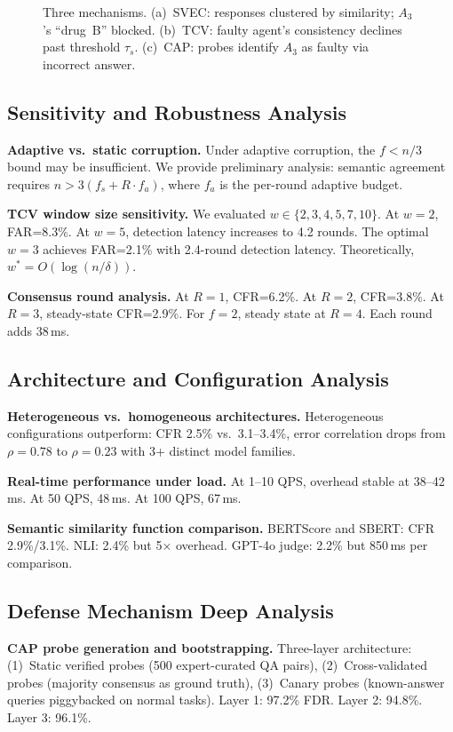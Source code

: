 \documentclass[journal,10pt]{IEEEtran}
\begin{document}
\begin{figure}[t]
\caption{Three mechanisms. (a)~SVEC: responses clustered by similarity; $A_3$'s ``drug~B'' blocked. (b)~TCV: faulty agent's consistency declines past threshold $\tau_s$. (c)~CAP: probes identify $A_3$ as faulty via incorrect answer.}
\label{fig:mechanisms}
\end{figure}

\subsection{Sensitivity and Robustness Analysis}
\textbf{Adaptive vs.\ static corruption.}
Under adaptive corruption, the $f < n/3$ bound may be insufficient. We provide preliminary analysis: semantic agreement requires $n > 3(f_s + R \cdot f_a)$, where $f_a$ is the per-round adaptive budget.

\textbf{TCV window size sensitivity.}
We evaluated $w \in \{2,3,4,5,7,10\}$. At $w=2$, FAR=8.3\%. At $w=5$, detection latency increases to 4.2 rounds. The optimal $w=3$ achieves FAR=2.1\% with 2.4-round detection latency. Theoretically, $w^* = O(\log(n/\delta))$.

\textbf{Consensus round analysis.}
At $R=1$, CFR=6.2\%. At $R=2$, CFR=3.8\%. At $R=3$, steady-state CFR=2.9\%. For $f=2$, steady state at $R=4$. Each round adds 38\,ms.

\subsection{Architecture and Configuration Analysis}
\textbf{Heterogeneous vs.\ homogeneous architectures.}
Heterogeneous configurations outperform: CFR 2.5\% vs.\ 3.1--3.4\%, error correlation drops from $\rho=0.78$ to $\rho=0.23$ with 3+ distinct model families.

\textbf{Real-time performance under load.}
At 1--10 QPS, overhead stable at 38--42\,ms. At 50 QPS, 48\,ms. At 100 QPS, 67\,ms.

\textbf{Semantic similarity function comparison.}
BERTScore and SBERT: CFR 2.9\%/3.1\%. NLI: 2.4\% but 5$\times$ overhead. GPT-4o judge: 2.2\% but 850\,ms per comparison.

\subsection{Defense Mechanism Deep Analysis}
\textbf{CAP probe generation and bootstrapping.}
Three-layer architecture: (1)~Static verified probes (500 expert-curated QA pairs), (2)~Cross-validated probes (majority consensus as ground truth), (3)~Canary probes (known-answer queries piggybacked on normal tasks). Layer 1: 97.2\% FDR. Layer 2: 94.8\%. Layer 3: 96.1\%.
\end{document}
